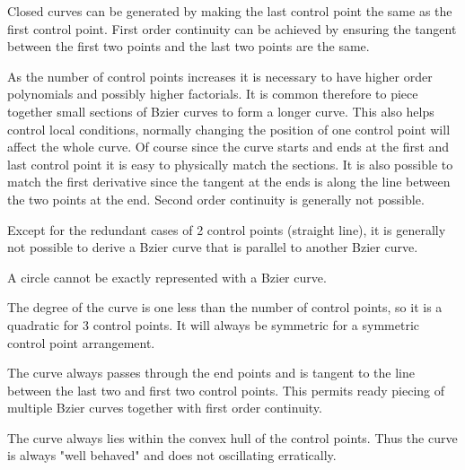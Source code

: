 Closed curves can be generated by making the last control point the
same as the first control point. First order continuity can be
achieved by ensuring the tangent between the first two points and the
last two points are the same.

As the number of control points increases it is necessary to have
higher order polynomials and possibly higher factorials. It is common
therefore to piece together small sections of Bzier curves to form
a longer curve. This also helps control local conditions, normally
changing the position of one control point will affect the whole
curve. Of course since the curve starts and ends at the first and last
control point it is easy to physically match the sections. It is also
possible to match the first derivative since the tangent at the ends
is along the line between the two points at the end.  Second order
continuity is generally not possible.




Except for the redundant cases of 2 control points (straight line), it
is generally not possible to derive a Bzier curve that is parallel
to another Bzier curve.


A circle cannot be exactly represented with a Bzier curve.

The degree of the curve is one less than the number of control points,
so it is a quadratic for 3 control points. It will always be symmetric
for a symmetric control point arrangement.






The curve always passes through the end points and is tangent to the
line between the last two and first two control points. This permits
ready piecing of multiple Bzier curves together with first order
continuity.






The curve always lies within the convex hull of the control
points. Thus the curve is always "well behaved" and does not
oscillating erratically.
